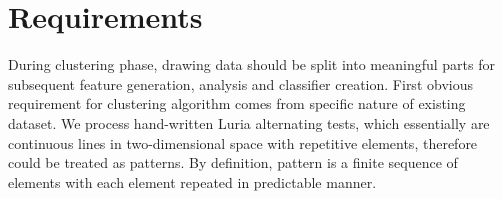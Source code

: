 \section{Requirements}

During clustering phase, drawing data should be split into meaningful parts for subsequent feature generation, analysis and classifier creation. First obvious requirement for clustering algorithm comes from specific nature of existing dataset. We  process hand-written Luria alternating tests, which essentially are continuous lines in two-dimensional space with repetitive elements, therefore could be treated as patterns. By definition, pattern is a finite sequence of elements with each element repeated in predictable manner.


